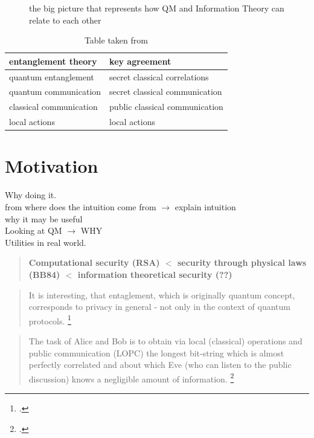 
\lipsum[1]

	\begin{figure}[H]
		\centering
		
		\caption{the big picture that represents how QM and Information Theory can relate to each other}
	\end{figure}
	\begin{table}[ht]
	 \centering
	 	\begin{tabular}{ l | l}
	 		\textbf{entanglement theory} & \textbf{key agreement} \\ 
	 		\hline 
	 		quantum entanglement & secret classical correlations \\ 
	 		quantum communication & secret classical communication \\ 
	 		classical communication & public classical communication \\ 
	 		local actions & local actions \\ 
	 	\end{tabular} 
	 	\caption{Table taken from \cite{4H07}}
	 \end{table}
	
	
	\section{Motivation}
	Why doing it. \\
	from where does the intuition come from $\rightarrow$ explain intuition\\
	why it may be useful\\
	Looking at QM $\rightarrow$ WHY\\
	Utilities in real world.\\
	
	\begin{quote}
	\textbf{Computational security (RSA) $<$ security through physical laws (BB84) $<$ information theoretical security (??)}
	\end{quote}
	
	\begin{quotation}
	It is interesting, that entaglement, which is originally quantum concept, corresponds to privacy in general - not only in the context of quantum protocols.
	\footcite{4H07}
	\end{quotation}
	\begin{quotation}
	The task of Alice and Bob is to obtain via local (classical) operations and public communication (LOPC) the longest bit-string which is almost perfectly correlated and about which Eve (who can listen to the public discussion) knows a negligible amount of information.
	\footcite{4H07}
	\end{quotation}		
	
